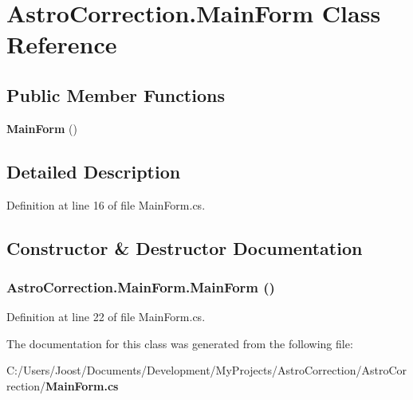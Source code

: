 \section{AstroCorrection.MainForm Class Reference}
\label{class_astro_correction_1_1_main_form}
\subsection*{Public Member Functions}
\begin{DoxyCompactItemize}
\item 
{\bf MainForm} ()
\end{DoxyCompactItemize}


\subsection{Detailed Description}


Definition at line 16 of file MainForm.cs.

\subsection{Constructor \& Destructor Documentation}
\subsubsection[{MainForm}]{\setlength{\rightskip}{0pt plus 5cm}AstroCorrection.MainForm.MainForm ()}\label{class_astro_correction_1_1_main_form_a579713e9d84777dfa0694c4c1286e291}


Definition at line 22 of file MainForm.cs.

The documentation for this class was generated from the following file:\begin{DoxyCompactItemize}
\item 
C:/Users/Joost/Documents/Development/MyProjects/AstroCorrection/AstroCorrection/{\bf MainForm.cs}\end{DoxyCompactItemize}
